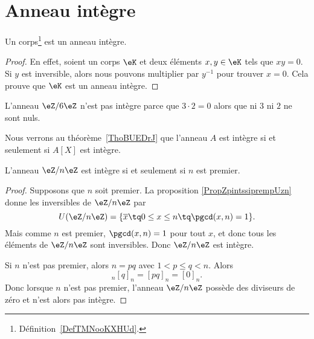 \section{Anneau intègre}
\label{SECAnneauxIntegres}





\begin{lemma}     \label{LEMooZSMEooUmSXWZ}
	Un corps\footnote{Définition~\ref{DefTMNooKXHUd}.} est un anneau intègre.
\end{lemma}

\begin{proof}
	En effet, soient un corps \( \eK\) et deux éléments \( x,y\in \eK\) tels que \( xy=0\). Si \( y\) est inversible, alors nous pouvons multiplier par \( y^{-1}\) pour trouver \( x=0\). Cela prouve que \( \eK\) est un anneau intègre.
\end{proof}


\begin{example}
	L'anneau \( \eZ/6\eZ\) n'est pas intègre parce que \( 3\cdot 2=0\) alors que ni \( 3\) ni \( 2\) ne sont nuls.
\end{example}

Nous verrons au théorème~\ref{ThoBUEDrJ} que l'anneau \( A\) est intègre si et seulement si \( A[X]\) est intègre.

\begin{corollary}   \label{CorZnInternprem}
	L'anneau \( \eZ/n\eZ\) est intègre si et seulement si \( n\) est premier.
\end{corollary}

\begin{proof}
	Supposons que \( n\) soit premier. La proposition \ref{PropZpintssiprempUzn} donne les inversibles de \( \eZ/n\eZ\) par
	\begin{equation}
		U(\eZ/n\eZ)=\{ \overline x\tq 0\leq x\leq n\tq\pgcd(x,n)=1 \}.
	\end{equation}
	Mais comme \( n\) est premier, \( \pgcd(x,n)=1\) pour tout \( x\), et donc tous les éléments de \( \eZ/n\eZ\) sont inversibles. Donc \( \eZ/n\eZ\) est intègre.

	Si \( n\) n'est pas premier, alors \( n=pq\) avec \( 1<p\leq q<n\). Alors
	\begin{equation}
		[p]_n[q]_n=[pq]_n=[0]_n.
	\end{equation}
	Donc lorsque \( n\) n'est pas premier,  l'anneau \( \eZ/n\eZ\) possède des diviseurs de zéro et n'est alors pas intègre.
\end{proof}



